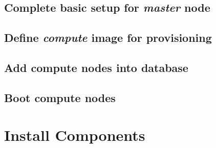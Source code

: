 \documentclass[letterpaper]{article}
\begin{document}
\vspace*{-0.15cm}
\subsection{Complete basic \Confluent{} setup for {\em master} node} \label{sec:setup_confluent}


\subsection{Define {\em compute} image for provisioning}


\vspace*{0.9cm}
\subsection{Add compute nodes into \Confluent{} database} \label{sec:confluent_add_nodes}


\subsection{Boot compute nodes} \label{sec:boot_computes}




\section{Install \OHPC{} Components} \label{sec:basic_install}

\end{document}

